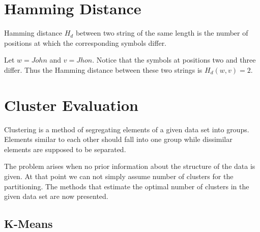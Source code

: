 \documentclass{mini}
\begin{document}
\section{Hamming Distance} \label{sec:hamming}

\begin{definition}
Hamming distance $H_d$ between two string of the same length is the number of positions at which the corresponding symbols differ.
\end{definition}

\begin{example} 
Let $w = John$ and $v = Jhon$. Notice that the symbols at positions two and three differ. Thus the Hamming distance between these two strings is $H_d(w,v) = 2$.
\end{example}

\section{Cluster Evaluation} \label{sec::cluster}

Clustering is a method of segregating elements of a given data set into groups. Elements similar to each other should fall into one group while dissimilar elements are supposed to be separated.

The problem arises when no prior information about the structure of the data is given. At that point we can not simply assume number of clusters for the partitioning. The methods that estimate the optimal number of clusters in the given data set are now presented.

\subsection{K-Means}
\end{document}
